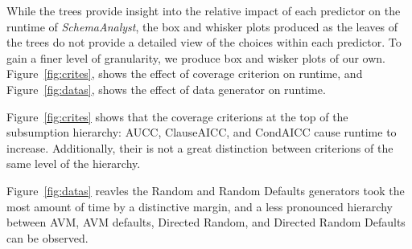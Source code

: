 

While the trees provide insight into the relative impact of each
predictor on the runtime of \textit{SchemaAnalyst}, the box and whisker
plots produced as the leaves of the trees do not provide a detailed view
of the choices within each predictor.  To gain a finer level of
granularity, we produce box and wisker plots of our own.
Figure~\ref{fig:crites}, shows the effect of coverage criterion on runtime, and Figure~\ref{fig:datas},
shows the effect of data generator on runtime.

Figure~\ref{fig:crites} shows that the coverage criterions at the top of the subsumption hierarchy: AUCC, ClauseAICC, and CondAICC cause runtime to
increase.  Additionally, their is not a great distinction between criterions of the same level of the hierarchy.

Figure~\ref{fig:datas} reavles the Random and Random Defaults generators took the most amount of time by a distinctive margin, and
a less pronounced hierarchy between AVM, AVM defaults, Directed Random, and Directed Random Defaults can be observed.
